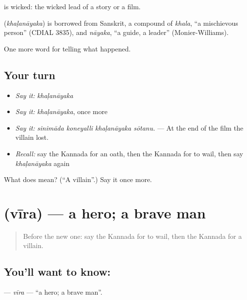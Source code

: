  is wicked: the wicked lead of a story or a film.

\begin{cousinweb}
\textbf{} (\emph{khaḷanāyaka}) is borrowed from Sanskrit, a compound of \emph{khala}, \textquotedblleft{}a mischievous person\textquotedblright{} (CDIAL 3835), and \emph{nāyaka}, \textquotedblleft{}a guide, a leader\textquotedblright{} (Monier-Williams).
\end{cousinweb}

\begin{grammarlens}[title={What you've built}]
One more word for telling what happened.
\end{grammarlens}

\subsection*{Your turn}
\begin{itemize}
\raggedright
  \item \emph{Say it:} \emph{khaḷanāyaka}
  \item \emph{Say it:} \emph{khaḷanāyaka}, once more
  \item \emph{Say it:} \emph{sinimāda koneyalli khaḷanāyaka sōtanu.} — At the end of the film the villain lost.
  \item \emph{Recall:} say the Kannada for an oath, then the Kannada for to wail, then say \emph{khaḷanāyaka} again
\end{itemize}

\begin{tcolorbox}[breakable,colback=teal!4,colframe=teal!35!black,title={Before you move on}]
What does  mean? (\textquotedblleft{}A villain\textquotedblright{}.) Say it once more.
\end{tcolorbox}
\section[\texorpdfstring{\kn{ವೀರ} (vīra)}{ವೀರ (vīra)}]{ (vīra) — a hero; a brave man}

\label{lesson:KA-C367-vira}



\begin{quote}
Before the new one: say the Kannada for to wail, then the Kannada for a villain.
\end{quote}

\subsection*{You'll want to know: }
\textbf{} — \emph{vīra} — \textquotedblleft{}a hero; a brave man\textquotedblright{}.

